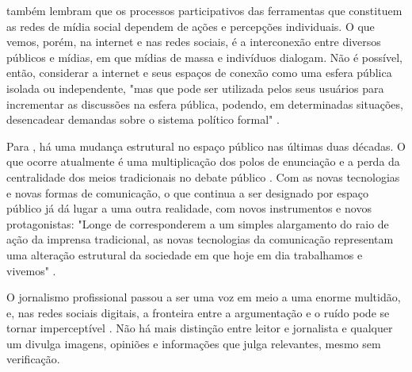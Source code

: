 \documentclass[portuguese]{textolivre}
\begin{document}
\textcite{recuero2017midia} também lembram que os processos participativos das ferramentas que constituem as redes de mídia social dependem de ações e percepções individuais. O que vemos, porém, na internet e nas redes sociais, é a interconexão entre diversos públicos e mídias, em que mídias de massa e indivíduos dialogam. Não é possível, então, considerar a internet e seus espaços de conexão como uma esfera pública isolada ou independente, "mas que pode ser utilizada pelos seus usuários para incrementar as discussões na esfera pública, podendo, em determinadas situações, desencadear demandas sobre o sistema político formal" \cite[p. 180]{sampaio2011internet}.

Para \textcite{aurelio_as_2019}, há uma mudança estrutural no espaço público nas últimas duas décadas. O que ocorre atualmente é uma multiplicação dos polos de enunciação \cite{pinto_fontes_2000} e a perda da centralidade dos meios tradicionais no debate público \cite{bentes_midia-multidao:_2015}. Com as novas tecnologias e novas formas de comunicação, o que continua a ser designado por espaço público já dá lugar a uma outra realidade, com novos instrumentos e novos protagonistas: "Longe de corresponderem a um simples alargamento do raio de ação da imprensa tradicional, as novas tecnologias da comunicação representam uma alteração estrutural da sociedade em que hoje em dia trabalhamos e vivemos" \cite[p. 124]{allen_scaling_2021}.

O jornalismo profissional passou a ser uma voz em meio a uma enorme multidão, e, nas redes sociais digitais, a fronteira entre a argumentação e o ruído pode se tornar imperceptível \cite{pinto_fontes_2000, dominique2010informar}. Não há mais distinção entre leitor e jornalista e qualquer um divulga imagens, opiniões e informações que julga relevantes, mesmo sem verificação.  
\end{document}

